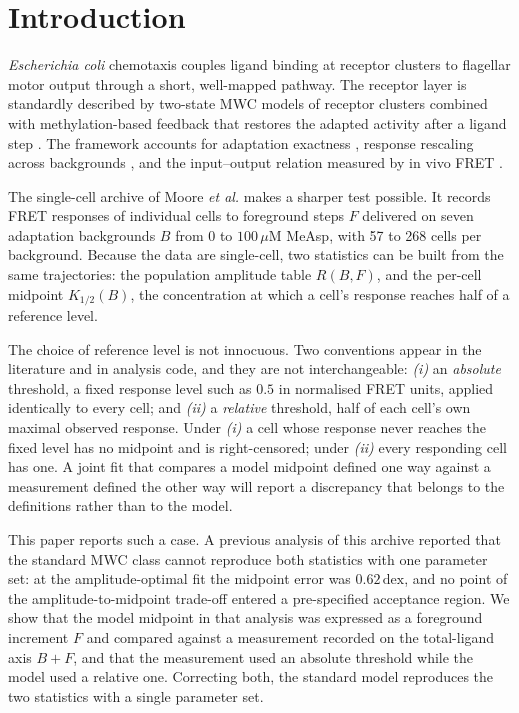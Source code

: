 ﻿\documentclass[11pt,a4paper]{article}
\newcommand{\dex}{\ensuremath{\,\mathrm{dex}}}
\newcommand{\Khalf}{\ensuremath{K_{1/2}}}
\begin{document}
\section{Introduction}

\emph{Escherichia coli} chemotaxis couples ligand binding at receptor clusters to flagellar motor
output through a short, well-mapped pathway. The receptor layer is standardly described by two-state
MWC models of receptor clusters \cite{Monod1965,SourjikBerg2002} combined with methylation-based
feedback that restores the adapted activity after a ligand step \cite{BarkaiLeibler1997}. The
framework accounts for adaptation exactness \cite{BarkaiLeibler1997}, response rescaling across
backgrounds \cite{Lazova2011}, and the input--output relation measured by in vivo FRET
\cite{SourjikBerg2002,Shimizu2010,Tu2008}.

The single-cell archive of Moore \emph{et al.} \cite{Moore2024} makes a sharper test possible. It
records FRET responses of individual cells to foreground steps $F$ delivered on seven adaptation
backgrounds $B$ from $0$ to $100\,\mu$M MeAsp, with 57 to 268 cells per background. Because the
data are single-cell, two statistics can be built from the same trajectories: the population
amplitude table $R(B,F)$, and the per-cell midpoint $\Khalf(B)$, the concentration at which a cell's
response reaches half of a reference level.

The choice of reference level is not innocuous. Two conventions appear in the literature and in
analysis code, and they are not interchangeable: \emph{(i)} an \emph{absolute} threshold, a fixed
response level such as $0.5$ in normalised FRET units, applied identically to every cell; and
\emph{(ii)} a \emph{relative} threshold, half of each cell's own maximal observed response. Under
\emph{(i)} a cell whose response never reaches the fixed level has no midpoint and is right-censored;
under \emph{(ii)} every responding cell has one. A joint fit that compares a model midpoint defined
one way against a measurement defined the other way will report a discrepancy that belongs to the
definitions rather than to the model.

This paper reports such a case. A previous analysis of this archive reported that the standard MWC
class cannot reproduce both statistics with one parameter set: at the amplitude-optimal fit the
midpoint error was $0.62\dex$, and no point of the amplitude-to-midpoint trade-off entered a
pre-specified acceptance region. We show that the model midpoint in that analysis was expressed as a
foreground increment $F$ and compared against a measurement recorded on the total-ligand axis
$B+F$, and that the measurement used an absolute threshold while the model used a relative one.
Correcting both, the standard model reproduces the two statistics with a single parameter set.
\end{document}
